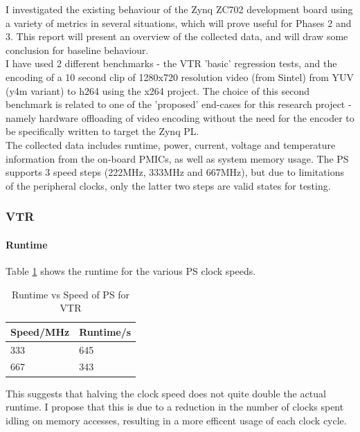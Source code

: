 \documentclass[a4paper]{article}
\begin{document}
  I investigated the existing behaviour of the Zynq ZC702 development board using a variety of metrics in several situations, which will prove useful for Phases 2 and 3.
  This report will present an overview of the collected data, and will draw some conclusion for baseline behaviour.\\
  I have used 2 different benchmarks - the VTR 'basic' regression tests, and the encoding of a 10 second clip of 1280x720 resolution video (from Sintel) from YUV (y4m variant) to h264 using the x264 project.
  The choice of this second benchmark is related to one of the 'proposed' end-cases for this research project - namely hardware offloading of video encoding without the need for the encoder to be specifically written to target the Zynq PL.\\
  The collected data includes runtime, power, current, voltage and temperature information from the on-board PMICs, as well as system memory usage. The PS supports 3 speed steps (222MHz, 333MHz and 667MHz), but due to limitations of the peripheral clocks, only the latter two steps are valid states for testing.

\subsubsection{VTR}
  \paragraph{Runtime}
    Table \ref{tab:vtr:rt} shows the runtime for the various PS clock speeds.
    \begin{table}[tbp]
      \centering
      \begin{tabular}{l | l}
        Speed/MHz & Runtime/s \\
        \hline
        333 & 645 \\
        667 & 343 \\
      \end{tabular}
      \caption{Runtime vs Speed of PS for VTR}
      \label{tab:vtr:rt}
    \end{table}
    This suggests that halving the clock speed does not quite double the actual runtime. I propose that this is due to a reduction in the number of clocks spent idling on memory accesses, resulting in a more efficent usage of each clock cycle.
\end{document}
